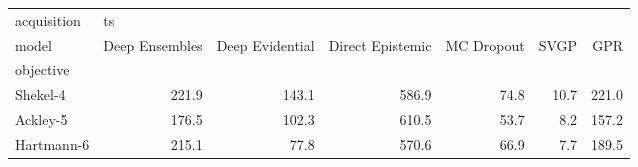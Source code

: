 \begin{tabular}{lrrrrrr}
\toprule
acquisition & \multicolumn{6}{l}{ts} \\
model & Deep Ensembles & Deep Evidential & Direct Epistemic & MC Dropout &  SVGP &    GPR \\
objective  &                &                 &                  &            &       &        \\
\midrule
Shekel-4   &          221.9 &           143.1 &            586.9 &       74.8 &  10.7 &  221.0 \\
Ackley-5   &          176.5 &           102.3 &            610.5 &       53.7 &   8.2 &  157.2 \\
Hartmann-6 &          215.1 &            77.8 &            570.6 &       66.9 &   7.7 &  189.5 \\
\bottomrule
\end{tabular}
